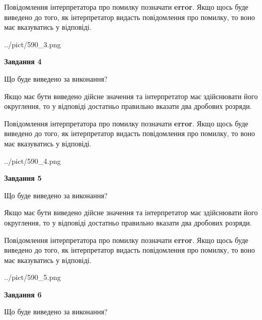 \documentclass[12pt, ukrainian]{article}
\begin{document}
{\begin {Large}
Повідомлення інтерпретатора про помилку позначати \textbf{error}.
Якщо щось буде виведено до того, як інтерпретатор видасть повідомлення про помилку, 
то воно має вказуватись у відповіді. \par

\begin{center}
	{../pict/590_3.png}
\end{center}
\newpage

{\begin {center}\textbf{Завдання 4}\end {center}}\par
Що буде виведено за виконання? \par

Якщо має бути виведено дійсне значення та інтерпретатор має здійснювати його округлення, 
то у відповіді достатньо правильно вказати два дробових розряди.

Повідомлення інтерпретатора про помилку позначати \textbf{error}.
Якщо щось буде виведено до того, як інтерпретатор видасть повідомлення про помилку, 
то воно має вказуватись у відповіді. \par

\begin{center}
	{../pict/590_4.png}
\end{center}
\newpage

{\begin {center}\textbf{Завдання 5}\end {center}}\par
Що буде виведено за виконання? \par

Якщо має бути виведено дійсне значення та інтерпретатор має здійснювати його округлення, 
то у відповіді достатньо правильно вказати два дробових розряди.

Повідомлення інтерпретатора про помилку позначати \textbf{error}.
Якщо щось буде виведено до того, як інтерпретатор видасть повідомлення про помилку, 
то воно має вказуватись у відповіді. \par

\begin{center}
	{../pict/590_5.png}
\end{center}
\newpage

{\begin {center}\textbf{Завдання 6}\end {center}}\par
Що буде виведено за виконання? \par


\end{Large}}
\end{document}
